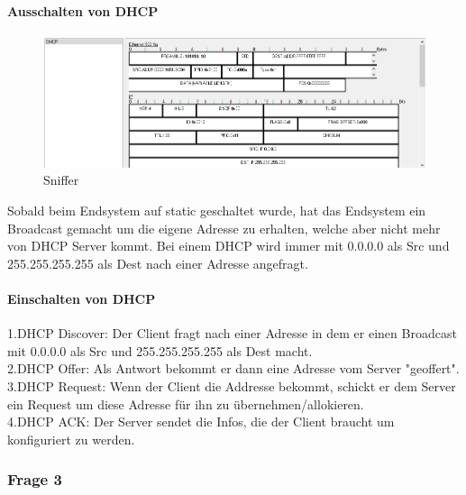 \paragraph{Ausschalten von DHCP}
\begin{figure}[!htb]
    \centering
    \includegraphics[width=\textwidth,height=.85\textwidth,keepaspectratio]{./img/dhcp_aus.png}
    \caption{Sniffer}
\end{figure}
\noindent
Sobald beim Endsystem auf static geschaltet wurde, hat das Endsystem ein Broadcast gemacht um die eigene Adresse zu erhalten, welche aber nicht mehr von DHCP Server kommt. Bei einem DHCP wird immer mit 0.0.0.0 als Src und 255.255.255.255 als Dest nach einer Adresse angefragt.
\paragraph{Einschalten von DHCP}
1.DHCP Discover: Der Client fragt nach einer Adresse in dem er einen Broadcast mit 0.0.0.0 als Src und 255.255.255.255 als Dest macht.\\
2.DHCP Offer: Als Antwort bekommt er dann eine Adresse vom Server "geoffert".\\
3.DHCP Request: Wenn der Client die Addresse bekommt, schickt er dem Server ein Request um diese Adresse für ihn zu übernehmen/allokieren.\\
4.DHCP ACK: Der Server sendet die Infos, die der Client braucht um konfiguriert zu werden.
\pagebreak

\subsubsection{Frage 3}
